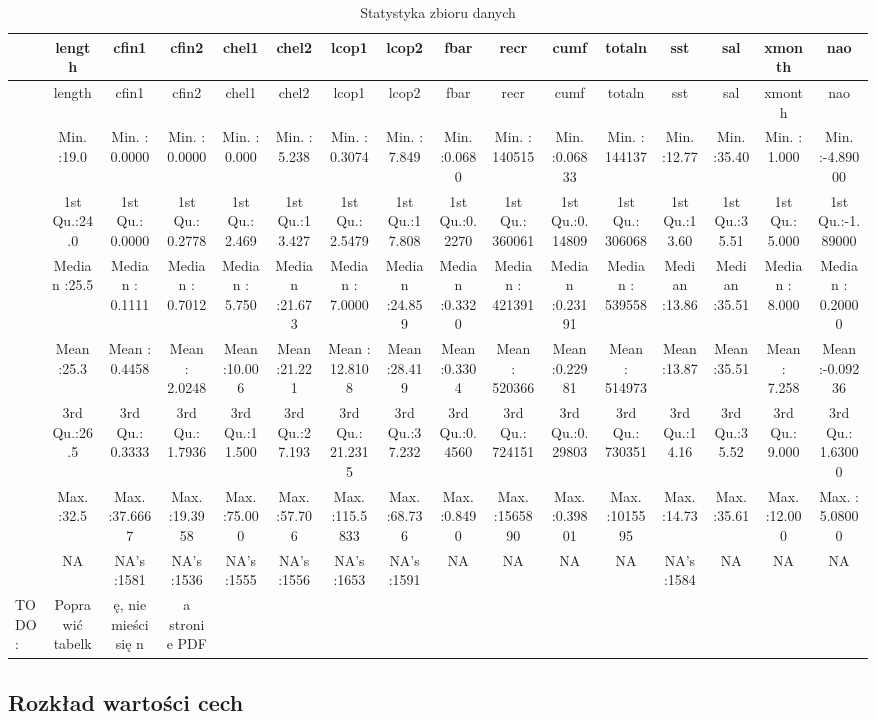 \documentclass[]{article}
\begin{document}
\begin{longtable}[]{@{}lccccccccccccccc@{}}
\caption{Statystyka zbioru danych}\tabularnewline
\toprule
& length & cfin1 & cfin2 & chel1 & chel2 & lcop1 & lcop2 & fbar & recr &
cumf & totaln & sst & sal & xmonth & nao\tabularnewline
\midrule
\endfirsthead
\toprule
& length & cfin1 & cfin2 & chel1 & chel2 & lcop1 & lcop2 & fbar & recr &
cumf & totaln & sst & sal & xmonth & nao\tabularnewline
\midrule
\endhead
& Min. :19.0 & Min. : 0.0000 & Min. : 0.0000 & Min. : 0.000 & Min. :
5.238 & Min. : 0.3074 & Min. : 7.849 & Min. :0.0680 & Min. : 140515 &
Min. :0.06833 & Min. : 144137 & Min. :12.77 & Min. :35.40 & Min. : 1.000
& Min. :-4.89000\tabularnewline
& 1st Qu.:24.0 & 1st Qu.: 0.0000 & 1st Qu.: 0.2778 & 1st Qu.: 2.469 &
1st Qu.:13.427 & 1st Qu.: 2.5479 & 1st Qu.:17.808 & 1st Qu.:0.2270 & 1st
Qu.: 360061 & 1st Qu.:0.14809 & 1st Qu.: 306068 & 1st Qu.:13.60 & 1st
Qu.:35.51 & 1st Qu.: 5.000 & 1st Qu.:-1.89000\tabularnewline
& Median :25.5 & Median : 0.1111 & Median : 0.7012 & Median : 5.750 &
Median :21.673 & Median : 7.0000 & Median :24.859 & Median :0.3320 &
Median : 421391 & Median :0.23191 & Median : 539558 & Median :13.86 &
Median :35.51 & Median : 8.000 & Median : 0.20000\tabularnewline
& Mean :25.3 & Mean : 0.4458 & Mean : 2.0248 & Mean :10.006 & Mean
:21.221 & Mean : 12.8108 & Mean :28.419 & Mean :0.3304 & Mean : 520366 &
Mean :0.22981 & Mean : 514973 & Mean :13.87 & Mean :35.51 & Mean : 7.258
& Mean :-0.09236\tabularnewline
& 3rd Qu.:26.5 & 3rd Qu.: 0.3333 & 3rd Qu.: 1.7936 & 3rd Qu.:11.500 &
3rd Qu.:27.193 & 3rd Qu.: 21.2315 & 3rd Qu.:37.232 & 3rd Qu.:0.4560 &
3rd Qu.: 724151 & 3rd Qu.:0.29803 & 3rd Qu.: 730351 & 3rd Qu.:14.16 &
3rd Qu.:35.52 & 3rd Qu.: 9.000 & 3rd Qu.: 1.63000\tabularnewline
& Max. :32.5 & Max. :37.6667 & Max. :19.3958 & Max. :75.000 & Max.
:57.706 & Max. :115.5833 & Max. :68.736 & Max. :0.8490 & Max. :1565890 &
Max. :0.39801 & Max. :1015595 & Max. :14.73 & Max. :35.61 & Max. :12.000
& Max. : 5.08000\tabularnewline
& NA & NA's :1581 & NA's :1536 & NA's :1555 & NA's :1556 & NA's :1653 &
NA's :1591 & NA & NA & NA & NA & NA's :1584 & NA & NA &
NA\tabularnewline
TODO: & Poprawić tabelk & ę, nie mieści się n & a stronie PDF & & & & &
& & & & & & &\tabularnewline
\bottomrule
\end{longtable}

\hypertarget{rozkux142ad-wartoux15bci-cech}{%
\subsection{Rozkład wartości cech}\label{rozkux142ad-wartoux15bci-cech}}
\end{document}
